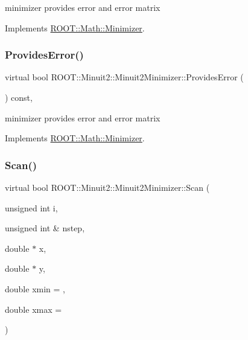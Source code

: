 minimizer provides error and error matrix 



Implements \mbox{\hyperlink{classROOT_1_1Math_1_1Minimizer_a71837caa295c76303c1a14679be1898d}{R\+O\+O\+T\+::\+Math\+::\+Minimizer}}.

\mbox{\label{classROOT_1_1Minuit2_1_1Minuit2Minimizer_a3a3a8abea38285fe639f2f0ec5505533}} 
\subsubsection{\texorpdfstring{ProvidesError()}{ProvidesError()}\hspace{0.1cm}{\footnotesize\ttfamily [2/2]}}
{\footnotesize\ttfamily virtual bool R\+O\+O\+T\+::\+Minuit2\+::\+Minuit2\+Minimizer\+::\+Provides\+Error (\begin{DoxyParamCaption}{ }\end{DoxyParamCaption}) const\hspace{0.3cm}{\ttfamily [inline]}, {\ttfamily [virtual]}}



minimizer provides error and error matrix 



Implements \mbox{\hyperlink{classROOT_1_1Math_1_1Minimizer_a71837caa295c76303c1a14679be1898d}{R\+O\+O\+T\+::\+Math\+::\+Minimizer}}.

\mbox{\label{classROOT_1_1Minuit2_1_1Minuit2Minimizer_a3f2f94c743a9b120a71da5ba23bd88cb}} 
\subsubsection{\texorpdfstring{Scan()}{Scan()}\hspace{0.1cm}{\footnotesize\ttfamily [1/2]}}
{\footnotesize\ttfamily virtual bool R\+O\+O\+T\+::\+Minuit2\+::\+Minuit2\+Minimizer\+::\+Scan (\begin{DoxyParamCaption}\item[{unsigned int}]{i,  }\item[{unsigned int \&}]{nstep,  }\item[{double $\ast$}]{x,  }\item[{double $\ast$}]{y,  }\item[{double}]{xmin = {},  }\item[{double}]{xmax = {} }\end{DoxyParamCaption})\hspace{0.3cm}{\ttfamily [virtual]}}

